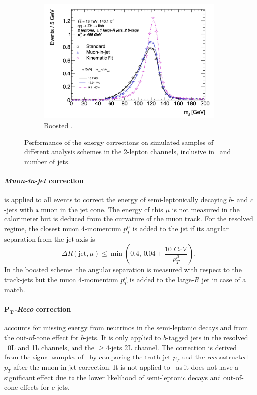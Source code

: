 \begin{figure}[h!]
\begin{subfigure}[b]{0.49\textwidth}
    \includegraphics[width=\textwidth]{Images/VH/Correct/CorrectedDist/bbB.png}
    \caption{Boosted \vhb.}
  \end{subfigure}
  \caption{Performance of the energy corrections on simulated samples of different analysis schemes in the 2-lepton channels, inclusive in \ptv\ and number of jets.}
  \label{fig:CorrResults}
\end{figure} 
  
\paragraph{\textit{Muon-in-jet} correction} is applied to all events to correct the energy of semi-leptonically decaying $b$- and $c$-jets with a muon in the jet cone. The energy of this $\mu$ is not measured in the calorimeter but is deduced from the curvature of the muon track. For the resolved regime, the closest muon 4-momentum $p_T^{\mu}$ is added to the jet if its angular separation from the jet axis is \[\Delta R(\textrm{jet}, \mu) \leq \min\left(0.4, \,0.04 + \frac{10 \textrm{ GeV}}{p_T^{\mu}}\right).\] In the boosted scheme, the angular separation is measured with respect to the track-jets but the muon 4-momentum $p_T^{\mu}$ is added to the large-$R$ jet in case of a match.

\paragraph{\textit{$\boldsymbol{P_T}$-Reco} correction} accounts for missing energy from neutrinos in the semi-leptonic decays and from the out-of-cone effect for $b$-jets. It is only applied to $b$-tagged jets in the resolved \vhb\ 0L and 1L channels, and the $\geq4$-jets 2L channel. The correction is derived from the signal samples of \vhb\ by comparing the truth jet $p_T$ and the reconstructed $p_T$ after the muon-in-jet correction. It is not applied to \vhc\ as it does not have a significant effect due to the lower likelihood of semi-leptonic decays and out-of-cone effects for $c$-jets.

